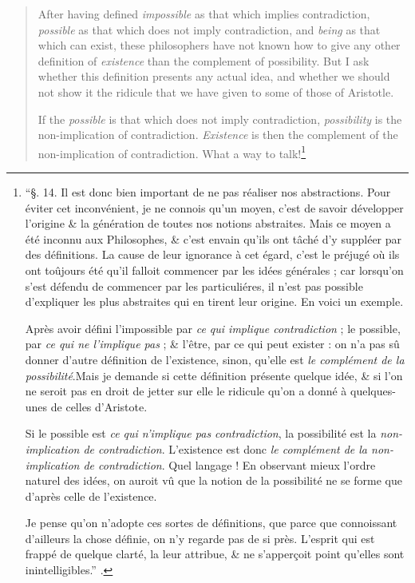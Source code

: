 \documentclass[output=paper]{langscibook}
\begin{document}
\begin{quote}
After having defined \emph{impossible} as that which implies contradiction, \emph{possible} as that which does not imply contradiction, and \emph{being} as that which can exist, these philosophers have not known how to give any other definition of \emph{existence} than the complement of possibility. But I ask whether this definition presents any actual idea, and whether we should not show it the ridicule that we have given to some of those of Aristotle. 

If the \emph{possible} is that which does not imply contradiction, \emph{possibility} is the non-implication of contradiction. \emph{Existence} is then the complement of the non-implication of contradiction. What a way to talk!\footnote{“§. 14. Il est donc bien important de ne pas réaliser nos abstractions. Pour éviter cet inconvénient, je ne connois qu’un moyen, c’est de savoir développer l’origine \& la génération de toutes nos notions abstraites. Mais ce moyen a été inconnu aux Philosophes, \& c’est envain qu’ils ont tâché d’y suppléer par des définitions. La cause de leur ignorance à cet égard, c’est le préjugé où ils ont toûjours été qu’il falloit commencer par les idées générales ; car lorsqu’on s’est défendu de commencer par les particuliéres, il n’est pas possible d’expliquer les plus abstraites qui en tirent leur origine. En voici un exemple.

Après avoir défini l’impossible par \emph{ce qui implique contradiction} ; le possible, par \emph{ce qui ne l’implique pas} ; \& l’être, par ce qui peut exister : on n’a pas sû donner d’autre définition de l’existence, sinon, qu’elle est \emph{le complément de la possibilité}.\footnotemark Mais je demande si cette définition présente quelque idée, \& si l’on ne seroit pas en droit de jetter sur elle le ridicule qu’on a donné à quelques-unes de celles d’Aristote. 

Si le possible est \emph{ce qui n’implique pas contradiction}, la possibilité est la \emph{non-implication de contradiction}. L’existence est donc \emph{le complément de la non-implication de contradiction}. Quel langage ! En observant mieux l’ordre naturel des idées, on auroit vû que la notion de la possibilité ne se forme que d’après celle de l’existence. 

Je pense qu’on n’adopte ces sortes de définitions, que parce que connoissant d’ailleurs la chose définie, on n’y regarde pas de si près. L’esprit qui est frappé de quelque clarté, la leur attribue, \& ne s’apperçoit point qu’elles sont inintelligibles.” \citep[234-236]{Condillac1746}.
}  
\end{quote}
\end{document}
